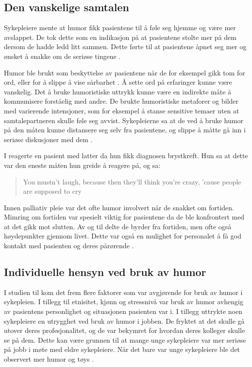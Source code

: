\subsection{Den vanskelige samtalen}

Sykepleiere mente at humor fikk pasientene til å føle seg hjemme og være mer
avslappet. De tok dette som en indikasjon på at pasientene stolte mer på dem
dersom de hadde ledd litt sammen. Dette førte til at pasientene åpnet seg mer
og ønsket å snakke om de seriøse tingene \cite{tanay2014}.

Humor ble brukt som beskyttelse av pasientene når de for eksempel gikk tom for
ord, eller for å slippe å vise sårbarhet . Å sette ord på
erfaringer kunne være vanskelig. Det å bruke humoristiske uttrykk kunne være en
indirekte måte å kommunisere forståelig med andre. De brukte humoristiske
metaforer og bilder med varierende intensjoner, som for eksempel å stanse
sensitive temaer uten at samtalepartneren skulle føle seg avvist.  Sykepleierne
sa at de ved å bruke humor på den måten kunne distansere seg selv fra
pasientene, og slippe å måtte gå inn i seriøse diskusjoner med dem
\cite{dean2008}.

I  reagerte en pasient med latter da hun fikk diagnosen
brystkreft. Hun sa at dette var den eneste måten hun greide å reagere på, og
sa: \blockquote[{}]{You mustn't laugh, because then
they'll think you're crazy, 'cause people are supposed to cry}.

Innen palliativ pleie var det ofte humor involvert når de snakket om fortiden.
Mimring om fortiden var spesielt viktig for pasientene da de ble konfrontert
med at det gikk mot slutten. Av og til delte de byrder fra fortiden, men ofte
også høydepunkter gjennom livet. Dette var også en mulighet for personalet å få
god kontakt med pasienten og deres pårørende \cite{dean2005}.

\subsection{Individuelle hensyn ved bruk av humor}

I studien til  kom det frem flere faktorer som var
avgjørende for bruk av humor i sykepleien. I tillegg til etnisitet, kjønn og
stressnivå var bruk av humor avhengig av pasientens personlighet og situasjonen
pasienten var i. I tillegg uttrykte noen sykepleiere en utrygghet ved bruk av
humor i jobben. De fryktet at det skulle gå utover deres profesjonalitet, og de
var bekymret for hvordan deres kolleger skulle se på dem. Dette kan være
grunnen til at mange unge sykepleiere var mer seriøse på jobb i møte med eldre
sykepleiere. Når det bare var unge sykepleiere ble det observert mer humor og
tøys \cite{tanay2014}.

